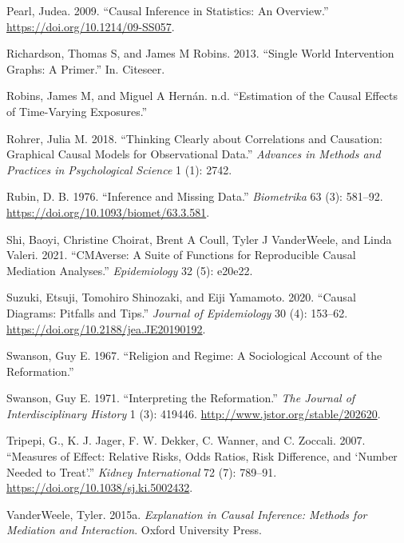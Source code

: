 \documentclass[
  singlecolumn]{report}
\newlength{\cslhangindent}
\newlength{\cslentryspacingunit} %
\newenvironment{CSLReferences}[2] %
 {%
  \setlength{\parindent}{0pt}
  \ifodd #1
  \let\oldpar\par
  \def\par{\hangindent=\cslhangindent\oldpar}
  \fi
  \setlength{\parskip}{#2\cslentryspacingunit}
 }%
 {}
\begin{document}
\begin{CSLReferences}{1}{0}
\leavevmode{}%
Pearl, Judea. 2009. {``Causal Inference in Statistics: An Overview.''}
\url{https://doi.org/10.1214/09-SS057}.

\leavevmode{}%
Richardson, Thomas S, and James M Robins. 2013. {``Single World
Intervention Graphs: A Primer.''} In. Citeseer.

\leavevmode{}%
Robins, James M, and Miguel A Hernán. n.d. {``Estimation of the Causal
Effects of Time-Varying Exposures.''}

\leavevmode{}%
Rohrer, Julia M. 2018. {``Thinking Clearly about Correlations and
Causation: Graphical Causal Models for Observational Data.''}
\emph{Advances in Methods and Practices in Psychological Science} 1 (1):
2742.

\leavevmode{}%
Rubin, D. B. 1976. {``Inference and Missing Data.''} \emph{Biometrika}
63 (3): 581--92. \url{https://doi.org/10.1093/biomet/63.3.581}.

\leavevmode{}%
Shi, Baoyi, Christine Choirat, Brent A Coull, Tyler J VanderWeele, and
Linda Valeri. 2021. {``CMAverse: A Suite of Functions for Reproducible
Causal Mediation Analyses.''} \emph{Epidemiology} 32 (5): e20e22.

\leavevmode{}%
Suzuki, Etsuji, Tomohiro Shinozaki, and Eiji Yamamoto. 2020. {``Causal
Diagrams: Pitfalls and Tips.''} \emph{Journal of Epidemiology} 30 (4):
153--62. \url{https://doi.org/10.2188/jea.JE20190192}.

\leavevmode{}%
Swanson, Guy E. 1967. {``Religion and Regime: A Sociological Account of
the Reformation.''}

\leavevmode{}%
Swanson, Guy E. 1971. {``Interpreting the Reformation.''} \emph{The
Journal of Interdisciplinary History} 1 (3): 419446.
\url{http://www.jstor.org/stable/202620}.

\leavevmode{}%
Tripepi, G., K. J. Jager, F. W. Dekker, C. Wanner, and C. Zoccali. 2007.
{``Measures of Effect: Relative Risks, Odds Ratios, Risk Difference, and
{`}Number Needed to Treat{'}.''} \emph{Kidney International} 72 (7):
789--91. \url{https://doi.org/10.1038/sj.ki.5002432}.

\leavevmode{}%
VanderWeele, Tyler. 2015a. \emph{Explanation in Causal Inference:
Methods for Mediation and Interaction}. Oxford University Press.


\end{CSLReferences}
\end{document}
